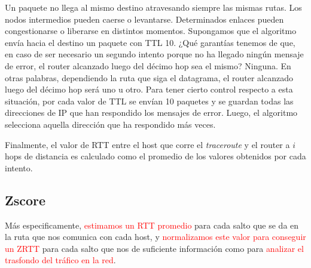 Un paquete no llega al mismo destino atravesando siempre las mismas rutas. Los nodos intermedios pueden
caerse o levantarse. Determinados enlaces pueden congestionarse o liberarse en distintos momentos.
Supongamos que el algoritmo envía hacia el destino un paquete con TTL 10. ¿Qué garantías tenemos de que,
en caso de ser necesario un segundo intento porque no ha llegado ningún mensaje de error, el router
alcanzado luego del décimo hop sea el mismo? Ninguna. En otras palabras, dependiendo la ruta que siga
el datagrama, el router alcanzado luego del décimo hop será uno u otro.
Para tener cierto control respecto a esta situación, por cada valor de TTL se envían 10 paquetes y
se guardan todas las direcciones de IP que han respondido los mensajes de error.
Luego, el algoritmo selecciona aquella dirección que ha respondido más veces.

Finalmente, el valor de RTT entre el host que corre el \emph{traceroute} y el router a $i$ hops de
distancia es calculado como el promedio de los valores obtenidos por cada intento.

\subsection{Zscore}

Más especificamente, \textcolor{red}{estimamos un RTT promedio} para cada salto que se da en
la ruta que nos comunica con cada host, y \textcolor{red}{normalizamos este valor para
conseguir un ZRTT} para cada salto que nos de suficiente informaci\'on como para
\textcolor{red}{analizar el trasfondo del tr\'afico en la red}.

